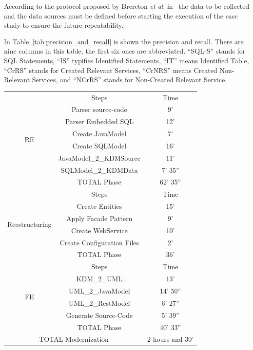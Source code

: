 \documentclass[a4paper,twoside]{article}
\begin{document}
According to the protocol proposed by Brereton \textit{et al}. in~\cite{case-study-template-2008} the data to be collected and the data sources must be defined before starting the execution of the case study to ensure the future repeatability.

In Table~\ref{tab:precision_and_recall} is shown the precision and recall. There are nine columns in this table, the first six ones are abbreviated. ``SQL-S'' stands for SQL Statements, ``IS'' typifies Identified Statements, ``IT'' means Identified Table, ``CrRS'' stands for Created Relevant Services, ``CrNRS'' means Created Non-Relevant Services, and ``NCrRS'' stands for Non-Created Relevant Service.  

\begin{table}
	
\begin{tabular}{|c|c|c|}
\hline 
\multirow{8}{*}{\begin{sideways}
RE
\end{sideways}} & Steps & Time\tabularnewline
\cline{2-3} 
 & Parser source-code & 9'\tabularnewline
\cline{2-3} 
 & Parser Embedded SQL & 12'\tabularnewline
\cline{2-3} 
 & Create JavaModel & 7'\tabularnewline
\cline{2-3} 
 & Create SQLModel & 16'\tabularnewline
\cline{2-3} 
 & JavaModel\_2\_KDMSource & 11'\tabularnewline
\cline{2-3} 
 & SQLModel\_2\_KDMData & 7' 35''\tabularnewline
\cline{2-3} 
 & \cellcolor{gray!25}TOTAL Phase & \cellcolor{gray!25}62' 35''\tabularnewline
\hline 
\multirow{6}{*}{\begin{sideways}
Reestructuring
\end{sideways}} & Steps & Time\tabularnewline
\cline{2-3} 
 & Create Entities & 15'\tabularnewline
\cline{2-3} 
 & Apply Facade Pattern & 9'\tabularnewline
\cline{2-3} 
 & Create WebService & 10'\tabularnewline
\cline{2-3} 
 & Create Configuration Files & 2'\tabularnewline
\cline{2-3} 
 & \cellcolor{gray!25}TOTAL Phase & \cellcolor{gray!25}36'\tabularnewline
\hline 
\multirow{6}{*}{\begin{sideways}
FE 
\end{sideways}} & Steps & Time\tabularnewline
\cline{2-3} 
 & KDM\_2\_UML & 13'\tabularnewline
\cline{2-3} 
 & UML\_2\_JavaModel & 14' 50''\tabularnewline
\cline{2-3} 
 & UML\_2\_RestModel & 6' 27''\tabularnewline
\cline{2-3} 
 & Generate Source-Code & 5' 39''\tabularnewline
\cline{2-3} 
 & \cellcolor{gray!25}TOTAL Phase & \cellcolor{gray!25}40' 33''\tabularnewline
\hline 
\multicolumn{2}{|c|}{\cellcolor{gray!25}TOTAL Modernization} & \cellcolor{gray!25}2 hours and 30'\tabularnewline
\hline 
\end{tabular}

\end{table}
\end{document}
